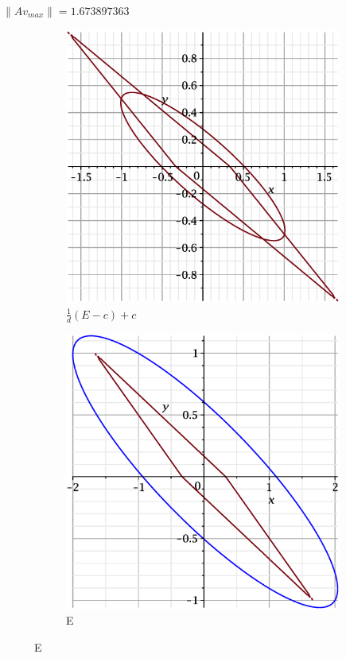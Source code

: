 \documentclass{beamer}
\begin{document}
\begin{frame}
$\|Av_{max}\| = 1.673897363$  
    \begin{figure}
    \begin{subfigure}{.5\textwidth}
        \centering
        \includegraphics[width=.8\linewidth]{pictures/3.eps}
        \caption{$\displaystyle\frac{1}{d}(E-c)+c$}
    \label{fig:sfig1}
    \end{subfigure}%
    \begin{subfigure}{.5\textwidth}
        \centering
        \includegraphics[width=.8\linewidth]{pictures/1_3.eps}
        \caption{E}
    \label{fig:sfig2}
    \end{subfigure}
\end{figure}

\end{frame}
\end{document}
